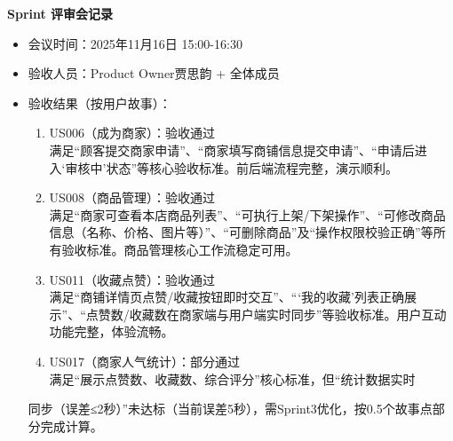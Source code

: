 \begin{levellist}
    \item \textbf{Sprint 评审会记录}
    \begin{itemize}
        \item 会议时间：2025年11月16日 15:00-16:30
        \item 验收人员：Product Owner贾思韵 + 全体成员
        \item 验收结果（按用户故事）：
              \begin{enumerate}
                  \item US006（成为商家）：验收通过 \\
                        满足“顾客提交商家申请”、“商家填写商铺信息提交申请”、“申请后进入‘审核中’状态”等核心验收标准。前后端流程完整，演示顺利。
                  \item US008（商品管理）：验收通过 \\
                        满足“商家可查看本店商品列表”、“可执行上架/下架操作”、“可修改商品信息（名称、价格、图片等）”、“可删除商品”及“操作权限校验正确”等所有验收标准。商品管理核心工作流稳定可用。
                  \item US011（收藏点赞）：验收通过 \\
                        满足“商铺详情页点赞/收藏按钮即时交互”、“‘我的收藏’列表正确展示”、“点赞数/收藏数在商家端与用户端实时同步”等验收标准。用户互动功能完整，体验流畅。
                  \item US017（商家人气统计）：部分通过 \\
                        满足“展示点赞数、收藏数、综合评分”核心标准，但“统计数据实时
              \end{enumerate}
              同步（误差≤2秒）”未达标（当前误差5秒），需Sprint3优化，按0.5个故事点部分完成计算。
    \end{itemize}


\end{levellist}

